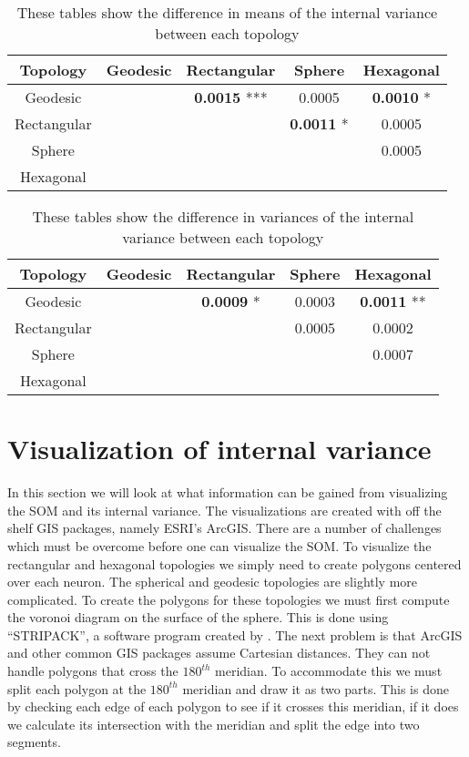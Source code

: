 \begin{table}[hbt]
  \centering
  \caption{These tables show the difference in means of the internal variance between each topology}
  \label{rlt:all}
  \begin{tabular}{|c||c|c|c|c|}
  \hline
  \textbf{Topology}&Geodesic &Rectangular	&Sphere			&Hexagonal		\\\hline
  \hline
  Geodesic	&& \textbf{0.0015} ***	& 0.0005		& \textbf{0.0010} *	\\\hline
  Rectangular		&& 			& \textbf{0.0011} *	& 0.0005		\\\hline
  Sphere	&& 			& 			& 0.0005 		\\\hline
  Hexagonal 	&& 			& 			&			\\\hline
  \end{tabular}
  \end{table}




\begin{table}[hbt]
  \centering
  \caption{These tables show the difference in variances of the internal variance between each topology}
  \label{rlt:allV}
  \begin{tabular}{|c||c|c|c|c|}
  \hline
  \textbf{Topology}&Geodesic &Rectangular	&Sphere			&Hexagonal		\\\hline
  \hline
  Geodesic	&& \textbf{0.0009} *	& 0.0003		& \textbf{0.0011} **	\\\hline
  Rectangular		&& 			& 0.0005		& 0.0002		\\\hline
  Sphere	&& 			& 			& 0.0007 		\\\hline
  Hexagonal 	&& 			& 			&			\\\hline
  \end{tabular}
  \end{table}



\section{Visualization of internal variance}
\label{rdq3}
In this section we will look at what information can be gained from
visualizing the SOM and its internal variance. The visualizations are created
with off the shelf GIS packages, namely ESRI's ArcGIS.  There are a number of
challenges which must be overcome before one can visualize the SOM.  To
visualize the rectangular and hexagonal topologies we simply need to create polygons
centered over each neuron.  The spherical and geodesic topologies are slightly
more complicated.  To create the polygons for these topologies we must first
compute the voronoi diagram on the surface of the sphere.  This is done using
``STRIPACK'', a software program created by \cite{Ranka97}.  The next problem
is that ArcGIS and other common GIS packages assume Cartesian distances.  They
can not handle polygons that cross the $180^{th}$ meridian.  To accommodate this we
must split each polygon at the $180^{th}$ meridian and draw it as two parts.  This
is done by checking each edge of each polygon to see if it crosses this
meridian, if it does we calculate its intersection with the meridian and split
the edge into two segments.

